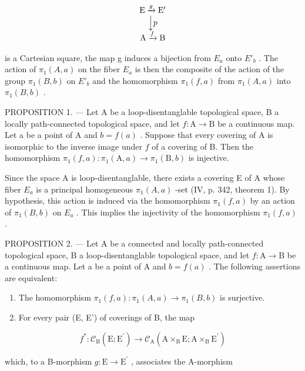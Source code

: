 \[
\begin{array}{c} \mathrm{E} \xrightarrow {g} \mathrm{E} ^ {\prime} \\ \Big \downarrow p \\ \mathrm{A} \xrightarrow {f} \mathrm{B} \end{array}
\]

is a Cartesian square, the map g induces a bijection from \(E_{a}\) onto \(E'_{b}\) . The action of \(\pi_{1}(A,a)\) on the fiber \(E_{a}\) is then the composite of the action of the group \(\pi_{1}(B,b)\) on \(E'_{b}\) and the homomorphism \(\pi_{1}(f,a)\) from \(\pi_{1}(A,a)\) into \(\pi_{1}(B,b)\) .

PROPOSITION 1. --- Let A be a loop-disentanglable topological space, B a locally path-connected topological space, and let \(f\colon\mathrm{A}\to\mathrm{B}\) be a continuous map. Let a be a point of A and \(b=f(a)\) . Suppose that every covering of A is isomorphic to the inverse image under \(f\) of a covering of B. Then the homomorphism \(\pi_{1}(f,a)\colon\pi_{1}(\mathrm{A},a)\to\pi_{1}(\mathrm{B},b)\) is injective.

Since the space A is loop-disentanglable, there exists a covering E of A whose fiber \(E_{a}\) is a principal homogeneous \(\pi_{1}(A,a)\) -set (IV, p. 342, theorem 1). By hypothesis, this action is induced via the homomorphism \(\pi_{1}(f,a)\) by an action of \(\pi_{1}(B,b)\) on \(E_{a}\) . This implies the injectivity of the homomorphism \(\pi_{1}(f,a)\) .

PROPOSITION 2. --- Let A be a connected and locally path-connected topological space, B a loop-disentanglable topological space, and let \(f\colon\mathrm{A}\to\mathrm{B}\) be a continuous map. Let a be a point of A and \(b=f(a)\) . The following assertions are equivalent:

\begin{enumerate}
\def\labelenumi{(\roman{enumi})}
\item
  The homomorphism \(\pi_1(f,a)\colon \pi_1(A,a)\to \pi_1(B,b)\) is surjective.
\item
  For every pair (E, E') of coverings of B, the map
\end{enumerate}

\[
f ^ {*} \colon \mathscr {C} _ {\mathrm{B}} (\mathrm{E}; \mathrm{E} ^ {\prime}) \rightarrow \mathscr {C} _ {\mathrm{A}} (\mathrm{A} \times_ {\mathrm{B}} \mathrm{E}; \mathrm{A} \times_ {\mathrm{B}} \mathrm{E} ^ {\prime})
\]

which, to a B-morphism \(g\colon \mathrm{E}\to \mathrm{E}^{\prime}\) , associates the A-morphism

